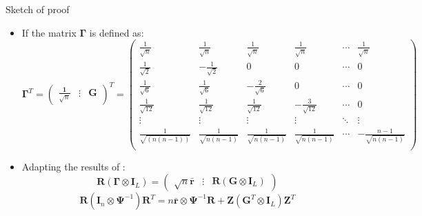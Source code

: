 \documentclass[t,9pt]{beamer}
\begin{document}
\begin{frame}[fragile]{Sketch of proof}
\begin{itemize}
    \item[4.] If the matrix $\pmb{\Gamma}$ is defined as:
{\scriptsize
    \begin{equation}\nonumber
    \pmb{\Gamma}^T=\begin{pmatrix}
     \frac{\pmb{1}}{\sqrt{n}} &\vdots &      \pmb{G}
    \end{pmatrix}^T=\begin{pmatrix}
    \frac{1}{\sqrt{n}} & \frac{1}{\sqrt{n}}& \frac{1}{\sqrt{n}}& \frac{1}{\sqrt{n}} & \cdots&\frac{1}{\sqrt{n}}\\
    \frac{1}{\sqrt{2}} & -\frac{1}{\sqrt{2}}& 0& 0 &\cdots& 0\\
    \frac{1}{\sqrt{6}} & \frac{1}{\sqrt{6}}& -\frac{2}{\sqrt{6}}& 0 & \cdots&0\\
    \frac{1}{\sqrt{12}} & \frac{1}{\sqrt{12}}& \frac{1}{\sqrt{12}}& -\frac{3}{\sqrt{12}} & \cdots&0\\
    \vdots & \vdots& \vdots& \vdots & \ddots&\vdots\\
    \frac{1}{\sqrt{(n(n-1))}} & \frac{1}{\sqrt{n(n-1)}}& \frac{1}{\sqrt{n(n-1)}}& \frac{1}{\sqrt{n(n-1)}} & \cdots&-\frac{n-1}{\sqrt{n(n-1)}}\\
    \end{pmatrix}
\end{equation}}
\item[5.] Adapting the results of \citep{srivastava2008models}: 
\begin{equation}\nonumber
\pmb{R}(\pmb{\Gamma}\otimes \pmb{I}_L)=\begin{pmatrix}
\sqrt{n}\bar{\pmb{r}} &\vdots & \pmb{R}(\pmb{G}\otimes \pmb{I}_L)
\end{pmatrix} 
\end{equation}
\begin{equation}\nonumber
    \pmb{R}\left(\pmb{I}_n\otimes\pmb{ \Psi}^{-1} \right)\pmb{R}^T=n\bar{\pmb{r}}\otimes \pmb{ \Psi}^{-1} \pmb{R}+\pmb{Z}(\pmb{G}^T\otimes\pmb{I}_L )\pmb{Z}^T
\end{equation}
\end{itemize}
\end{frame}
\end{document}
